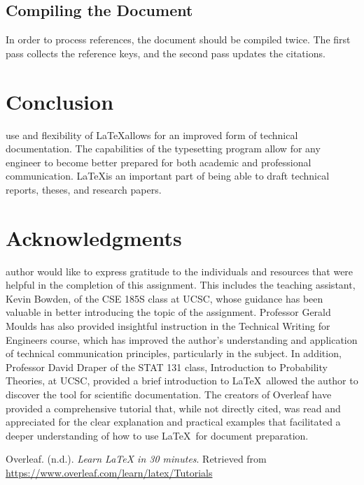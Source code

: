 \documentclass[12pt,journal,compsoc]{IEEEtran}
\begin{document}
\subsection{Compiling the Document}
In order to process references, the document should be compiled twice. The first pass collects the reference keys, and the second pass updates the citations.

\section{Conclusion}

 use and flexibility of \LaTeX allows for an improved form of technical documentation. The capabilities of the typesetting program allow for any engineer to become better prepared for both academic and professional communication. \LaTeX is an important part of being able to draft technical reports, theses, and research papers. 

\section*{Acknowledgments}

 author would like to express gratitude to the individuals and resources that were helpful in the completion of this assignment. This includes the teaching assistant, Kevin Bowden, of the CSE 185S class at UCSC, whose guidance has been valuable in better introducing the topic of the assignment. Professor Gerald Moulds has also provided insightful instruction in the Technical Writing for Engineers course, which has improved the author's understanding and application of technical communication principles, particularly in the subject. In addition, Professor David Draper of the STAT 131 class, Introduction to Probability Theories, at UCSC, provided a brief introduction to \LaTeX\ allowed the author to discover the tool for scientific documentation. The creators of Overleaf have provided a comprehensive tutorial that, while not directly cited, was read and appreciated for the clear explanation and practical examples that facilitated a deeper understanding of how to use \LaTeX\ for document preparation.

\begin{thebibliography}{1}

Overleaf. (n.d.). \textit{Learn LaTeX in 30 minutes}. Retrieved from \url{https://www.overleaf.com/learn/latex/Tutorials}

\end{thebibliography}
\end{document}
